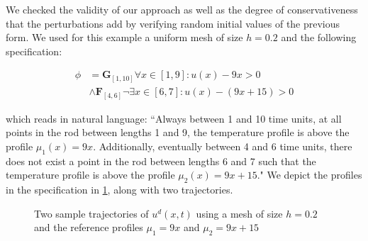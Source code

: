 \documentclass[oribibl]{llncs/llncs}
\newcommand{\Always}{\mathbf{G}}
\newcommand{\Event}{\mathbf{F}}
\begin{document}
We checked the validity of our approach as well as the degree of
conservativeness that the perturbations add by verifying random initial values
of the previous form. We used for this example a uniform mesh of size $h = 0.2$
and the following specification: 

\begin{equation}
    \begin{aligned}
        \phi &= \Always_{[1, 10]} \forall x \in [1, 9]: u(x) - 9x > 0 \\
        &\wedge \Event_{[4, 6]} \lnot \exists x \in [6, 7]: u(x) - (9x + 15) > 0
\end{aligned}
\end{equation}

which reads in natural language: ``Always between 1 and 10 time units, at all
points in the rod between lengths 1 and 9, the temperature profile is above the
profile $\mu_1(x) = 9x$. Additionally, eventually between 4 and 6 time units,
there does not exist a point in the rod between lengths 6 and 7 such that the
temperature profile is above the profile $\mu_2(x) = 9x + 15$." We depict the
profiles in the specification in \cref{fig:ex2_evolution}, along with two
trajectories.

\begin{figure}[!t]
    \centering 
        \hfill
        \hfill
        \caption{Two sample trajectories of $u^d(x, t)$ using a mesh of size
        $h=0.2$ and the reference profiles $\mu_1 = 9x$ and $\mu_2 = 9x + 15$}
    \label{fig:ex2_evolution}
\end{figure}
\end{document}
